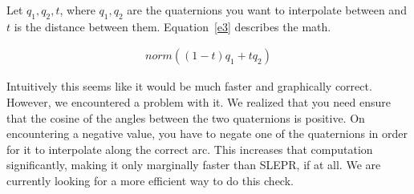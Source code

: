\documentclass[10pt]{article}
\begin{document}
\begin{enumerate}
Let $q_1, q_2, t$, where $q_1, q_2$ are the quaternions you want to interpolate
between and $t$ is the distance between them. Equation~\ref{e3} describes the math. 

\begin{align}
\label{e3}
norm((1-t)q_1 + tq_2)
\end{align}

Intuitively this seems like it would be much faster and graphically correct.
However, we encountered a problem with it. We realized that you need ensure
that the cosine of the angles between the two quaternions is positive.
On encountering a negative value, you have to negate one of the quaternions in
order for it to interpolate along the correct arc. This increases
that computation significantly, making it only marginally faster than SLEPR, if
at all. We are currently looking for a more efficient way to do this check.
\end{enumerate}
\end{document}
